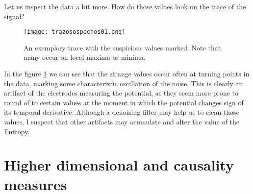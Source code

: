 \documentclass[10pt]{article}
\begin{document}
Let us inspect the data a bit more. How do those values look on the trace of
the signal?

\begin{figure}
  \begin{center}
    \texttt{[image: trazosospechos01.png]}
  \end{center}
  \caption{An exemplary trace with the suspicious values marked. Note that
  many occur on local maxima or minima.}
  \label{trazomarcas01}
\end{figure}

In the figure \ref{trazomarcas01} we can see that the strange values occur often
at turning points in the data, marking some characteriztic oscillation of the noise.
This is clearly an artifact of the electrodes measuring the potential, as they
seem more prone to round of to certain values at the moment in which the
potential changes sign of its temporal derivative. Although a denoizing filter may
help us to clean those values, I suspect that other artifacts may acumulate and
alter the value of the Entropy.


\section{Higher dimensional and causality measures}
\end{document}

